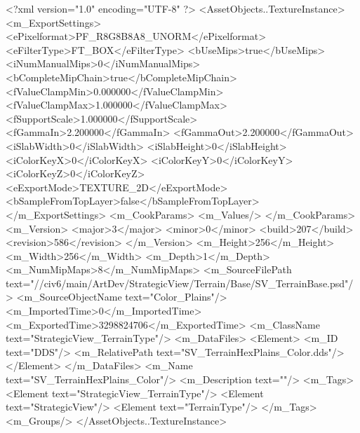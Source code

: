 <?xml version="1.0" encoding="UTF-8" ?>
<AssetObjects..TextureInstance>
	<m_ExportSettings>
		<ePixelformat>PF_R8G8B8A8_UNORM</ePixelformat>
		<eFilterType>FT_BOX</eFilterType>
		<bUseMips>true</bUseMips>
		<iNumManualMips>0</iNumManualMips>
		<bCompleteMipChain>true</bCompleteMipChain>
		<fValueClampMin>0.000000</fValueClampMin>
		<fValueClampMax>1.000000</fValueClampMax>
		<fSupportScale>1.000000</fSupportScale>
		<fGammaIn>2.200000</fGammaIn>
		<fGammaOut>2.200000</fGammaOut>
		<iSlabWidth>0</iSlabWidth>
		<iSlabHeight>0</iSlabHeight>
		<iColorKeyX>0</iColorKeyX>
		<iColorKeyY>0</iColorKeyY>
		<iColorKeyZ>0</iColorKeyZ>
		<eExportMode>TEXTURE_2D</eExportMode>
		<bSampleFromTopLayer>false</bSampleFromTopLayer>
	</m_ExportSettings>
	<m_CookParams>
		<m_Values/>
	</m_CookParams>
	<m_Version>
		<major>3</major>
		<minor>0</minor>
		<build>207</build>
		<revision>586</revision>
	</m_Version>
	<m_Height>256</m_Height>
	<m_Width>256</m_Width>
	<m_Depth>1</m_Depth>
	<m_NumMipMaps>8</m_NumMipMaps>
	<m_SourceFilePath text="//civ6/main/ArtDev/StrategicView/Terrain/Base/SV_TerrainBase.psd"/>
	<m_SourceObjectName text="Color_Plains"/>
	<m_ImportedTime>0</m_ImportedTime>
	<m_ExportedTime>3298824706</m_ExportedTime>
	<m_ClassName text="StrategicView_TerrainType"/>
	<m_DataFiles>
		<Element>
			<m_ID text="DDS"/>
			<m_RelativePath text="SV_TerrainHexPlains_Color.dds"/>
		</Element>
	</m_DataFiles>
	<m_Name text="SV_TerrainHexPlains_Color"/>
	<m_Description text=""/>
	<m_Tags>
		<Element text="StrategicView_TerrainType"/>
		<Element text="StrategicView"/>
		<Element text="TerrainType"/>
	</m_Tags>
	<m_Groups/>
</AssetObjects..TextureInstance>

